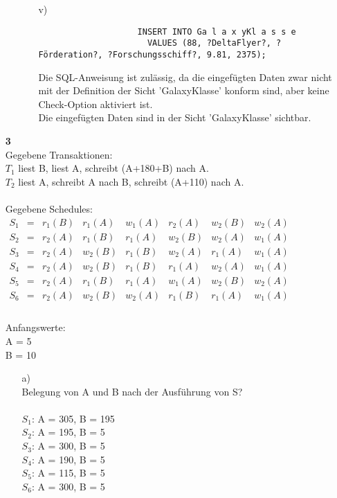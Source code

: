 \documentclass[a4paper,11pt,fleqn]{scrartcl}
\begin{document}
\begin{enumerate}
\begin{enumerate}
\begin{enumerate}
				\item[v)] \quad \\
				\begin{verbatim}
					INSERT INTO Ga l a x yKl a s s e
					  VALUES (88, ?DeltaFlyer?, ?Förderation?, ?Forschungsschiff?, 9.81, 2375);
				\end{verbatim}
				Die SQL-Anweisung ist zulässig, da die eingefügten Daten zwar nicht mit der Definition der Sicht 'GalaxyKlasse' konform sind, aber keine Check-Option aktiviert ist.\\
				Die eingefügten Daten sind in der Sicht 'GalaxyKlasse' sichtbar.
			\end{enumerate}
		\end{enumerate}

		\item[\textbf{3}] \quad \\
			Gegebene Transaktionen:\\
			$T_1$ liest B, liest A, schreibt (A+180+B) nach A.\\
			$T_2$ liest A, schreibt A nach B, schreibt (A+110) nach A.\\
			\\
			Gegebene Schedules:\\
			\(
			\begin{array}{lcccccccccc}
				S_1 &=& r_1(B) & r_1(A) & w_1(A) & r_2(A) & w_2(B) & w_2(A) \\
				S_2 &=& r_2(A) & r_1(B) & r_1(A) & w_2(B) & w_2(A) & w_1(A) \\
				S_3 &=& r_2(A) & w_2(B) & r_1(B) & w_2(A) & r_1(A) & w_1(A) \\
				S_4 &=& r_2(A) & w_2(B) & r_1(B) & r_1(A) & w_2(A) & w_1(A) \\
				S_5 &=& r_2(A) & r_1(B) & r_1(A) & w_1(A) & w_2(B) & w_2(A) \\
				S_6 &=& r_2(A) & w_2(B) & w_2(A) & r_1(B) & r_1(A) & w_1(A) \\
			\end{array}
			\)
			\\ \\
			Anfangswerte:\\
			A = 5\\
			B = 10

			\begin{enumerate}
				\item[a)]\quad \\
				Belegung von A und B nach der Ausführung von S?\\
				\\
				$S_1$: A = 305, B = 195\\
				$S_2$: A = 195, B = 5\\
				$S_3$: A = 300, B = 5\\
				$S_4$: A = 190, B = 5\\
				$S_5$: A = 115, B = 5\\
				$S_6$: A = 300, B = 5


\end{enumerate}
\end{enumerate}
\end{document}
